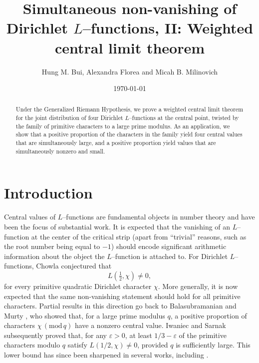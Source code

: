 \documentclass[12pt, reqno]{amsart}
\title[Simultaneous non-vanishing: Weighted central limit theorem]{Simultaneous non-vanishing of Dirichlet $L$--functions, II: Weighted central limit theorem}
\date{\today}
\renewcommand{\pmod}[1]{\,(\mathrm{mod}\,#1)}
\numberwithin{equation}{section}
\numberwithin{theorem}{section}
\numberwithin{equation}{section}
\begin{document}
\author{Hung M. Bui, Alexandra Florea and Micah B. Milinovich}
\address{Department of Mathematics, University of Manchester, Manchester M13 9PL, UK}
\address{UC Irvine, Mathematics Department, Rowland Hall, Irvine 92697, USA}
\address{Department of Mathematics, University of Mississippi, University, MS 38677 USA}

\begin{abstract}
Under the Generalized Riemann Hypothesis, we prove a weighted central limit theorem for the joint distribution of four Dirichlet $L$--functions at the central point, twisted by the family of primitive characters to a large prime modulus. As an application, we show that a positive proportion of the characters in the family yield four central values that are simultaneously large, and a positive proportion yield values that are simultaneously nonzero and small.

\end{abstract}

\allowdisplaybreaks

\maketitle


\section{Introduction}


Central values of $L$--functions are fundamental objects in number theory and have been the focus of substantial work. It is expected that the vanishing of an $L$--function at the center of the critical strip (apart from ``trivial'' reasons, such as the root number being equal to $-1$) should encode significant arithmetic information about the object the $L$--function is attached to. For Dirichlet $L$--functions, Chowla \cite{chowla} conjectured that
$$L(\tfrac 12,\chi) \neq 0,$$
for every primitive quadratic Dirichlet character $\chi$. More generally, it is now expected that the same non-vanishing statement should hold for all primitive characters. Partial results in this direction go back to Balasubramanian and Murty \cite{BM}, who showed that, for a large prime modulus $q$, a positive proportion of characters $\chi \pmod q$ have a nonzero central value. Iwaniec and Sarnak \cite{IS1} subsequently proved that, for any $\varepsilon>0$, at least $1/3-\varepsilon$ of the primitive characters modulo $q$ satisfy $L(1/2,\chi) \neq 0$, provided $q$ is sufficiently large. This lower bound has since been sharpened in several works, including \cite{bui, KMN, QW}. 
\end{document}
